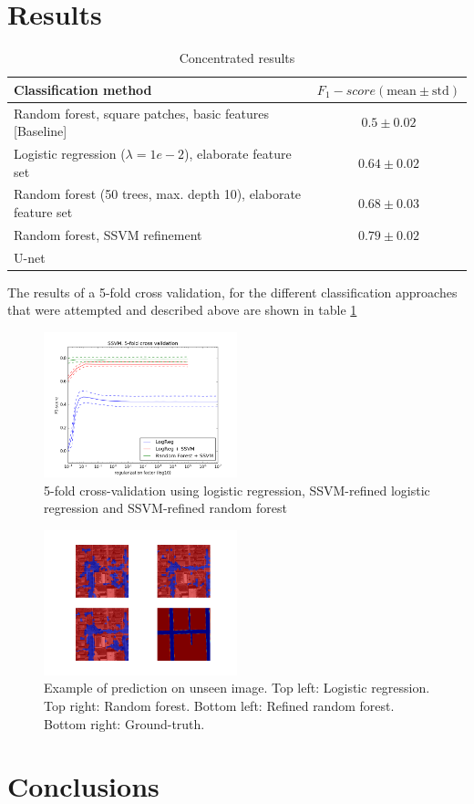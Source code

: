 \documentclass[10pt,conference,compsocconf]{IEEEtran}
\begin{document}
	\section{Results}
		\begin{table}
		\begin{tabular}{p{} c}		
			\textbf{Classification method} &  \textbf{$F_1-score (\text{mean}\pm \text{std})$}\\
			\hline \hline
			 Random forest, square patches, basic features [Baseline] & $0.5 \pm 0.02$ \\ \hline
			Logistic regression ($\lambda = 1e-2$), elaborate feature set & $0.64 \pm 0.02$ \\ \hline
			Random forest (50 trees, max. depth 10), elaborate feature set & $0.68 \pm 0.03$ \\ \hline
			Random forest, SSVM refinement & $0.79 \pm 0.02$ \\ \hline
			U-net & $ $ \\
			\hline
		\end{tabular}
		\caption{\label{table:results}Concentrated results}
		\end{table}
	The results of a 5-fold cross validation, for the different classification
  approaches that were attempted and described above are shown in table \ref{table:results}
	\begin{figure}[h]
		\centering
		\includegraphics[width=0.5\textwidth]{pics/cross_val_ssvm.png}
		\caption{5-fold cross-validation using logistic regression, SSVM-refined
      logistic regression and SSVM-refined random forest}
		\label{fig:example}
	\end{figure}
		\begin{figure}[h]
			\centering
			\includegraphics[width=0.5\textwidth]{pics/prediction.png}
			\caption{Example of prediction on unseen image. Top left: Logistic
        regression. Top right: Random forest. Bottom left: Refined random
        forest. Bottom right: Ground-truth.}
			\label{fig:predictions}
		\end{figure}
	\section{Conclusions}
	
	
	
\end{document}
